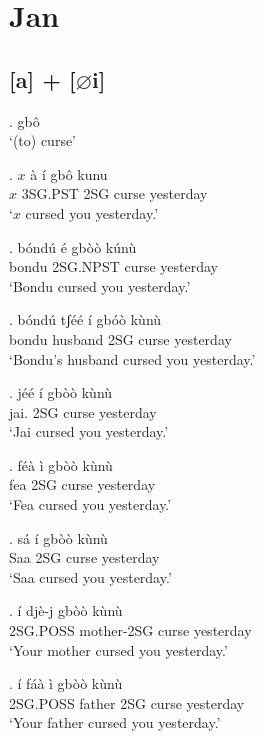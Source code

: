 \documentclass{assets/fieldnotes}
\begin{document}
\section{Jan}

\subsection{[a] + [$\varnothing$i]}

\ex. gbô \\
`(to) curse'

\ex. $x$ à í gbô kunu \\
$x$ 3SG.PST 2SG curse yesterday \\
`$x$ cursed you yesterday.'

\exg. bóndú é gbòò kúnù \\
bondu 2SG.NPST curse yesterday \\
`Bondu cursed you yesterday.'


\ex. bóndú tʃéé í gbóò kùnù \\
bondu husband 2SG curse yesterday \\
`Bondu's husband cursed you yesterday.' 


\ex. jéé í gbòò kùnù \\
jai. 2SG curse yesterday \\
`Jai cursed you yesterday.'


\ex. féà ì gbòò kùnù \\
fea 2SG curse yesterday \\
`Fea cursed you yesterday.'


\ex. sá í gbòò kùnù \\
Saa 2SG curse yesterday \\
`Saa cursed you yesterday.'

\ex. í djè-j gbòò kùnù \\
2SG.POSS mother-2SG curse yesterday \\
`Your mother cursed you yesterday.'

\ex. í fáà ì gbòò kùnù \\
2SG.POSS father 2SG curse yesterday \\
`Your father cursed you yesterday.'
\end{document}
